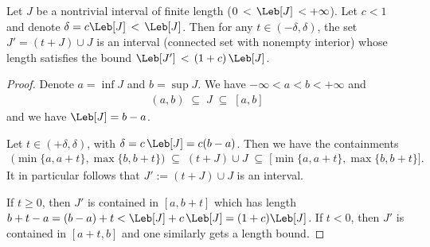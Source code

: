 \begin{lemma}
  \label{lem:overlapping-union-interval-copies}
  Let $J$ be a nontrivial interval of finite length ($0 \, < \, \Leb[J] \, < +\infty$).
  Let $c < 1$ and denote $\delta = c \Leb[J] \, < \, \Leb[J]$.
  Then for any $t \in (-\delta,\delta)$, the set
  $J' = (t+J) \cup J$ is an interval (connected set with nonempty interior)
  whose length satisfies the bound $\Leb[J'] \, < \, (1+c) \, \Leb[J]$.
\end{lemma}
\begin{proof}
  Denote $a = \inf J$ and $b = \sup J$. We have $-\infty < a < b < +\infty$ and
  \begin{align*}
    (a,b) \; \subseteq \; J \; \subseteq \; [a,b]
  \end{align*}
  and we have $\Leb[J] = b - a$.

  Let $t \in (+\delta,\delta)$, with $\delta = c \, \Leb[J] = c(b-a)$.
  Then we have the containments
  \begin{align*}
    \big( \min \{a,a+t\} , \max \{b,b+t\} \big)
      \; \subseteq \; (t+J) \cup J
      \; \subseteq \; \big[ \min \{a,a+t\} , \max \{b,b+t\} \big] .
  \end{align*}
  It in particular follows that $J' := (t+J) \cup J$ is an interval.

  If $t \ge 0$, then $J'$ is contained in
  $[a,b+t]$ which has length $b+t-a = (b-a) + t < \Leb[J] + c \, \Leb[J] = (1+c) \Leb[J]$.
  If $t < 0$, then $J'$ is contained in $[a+t,b]$ and one similarly gets a length bound.
\end{proof}


